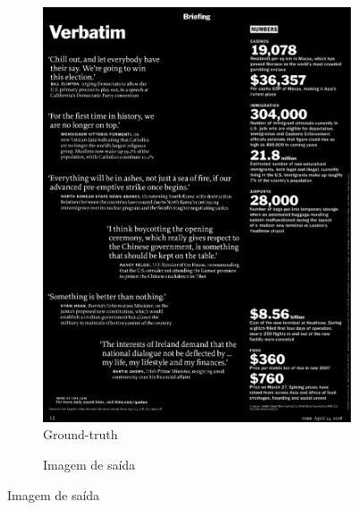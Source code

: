 \documentclass{article}
\begin{document}
\begin{figure}[H]
\begin{subfigure}[b]{90px}
			\caption{Ground-truth}
			\includegraphics[width=\textwidth]{17.png}
		\end{subfigure}	
		\qquad
		\begin{subfigure}[b]{90px}				
			\caption{Imagem de saída}

\end{subfigure}
\end{figure}
\end{document}
